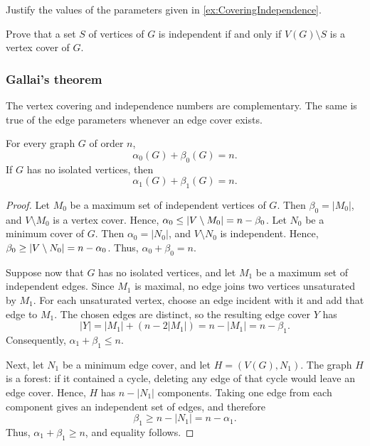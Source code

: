\begin{Exercise}
Justify the values of the parameters given in \cref{ex:CoveringIndependence}.
\end{Exercise}

\begin{Exercise}
Prove that a set $S$ of vertices of $G$ is independent if and only if $V(G) \setminus S$ is a vertex cover of $G$.
\end{Exercise}

\subsubsection{Gallai's theorem}
The vertex covering and independence numbers are complementary. The same is true of the edge parameters whenever an edge cover exists.

\begin{Theorem}[Gallai]
For every graph $G$ of order $n$,
\begin{equation*}
\alpha_0(G) + \beta_0(G) = n.
\end{equation*}
If $G$ has no isolated vertices, then
\begin{equation*}
\alpha_1(G) + \beta_1(G) = n.
\end{equation*}
\end{Theorem}

\begin{proof}
Let $M_0$ be a maximum set of independent vertices of $G$. Then $\beta_0 = |M_0|$, and $V \setminus M_0$ is a vertex cover. Hence, $\alpha_0 \le \vqty{V \setminus M_0} = n - \beta_0$. Let $N_0$ be a minimum cover of $G$. Then $\alpha_0 = |N_0|$, and $V \setminus N_0$ is independent. Hence, $\beta_0 \ge \vqty{V \setminus N_0} = n - \alpha_0$. Thus, $\alpha_0 + \beta_0 = n$.

Suppose now that $G$ has no isolated vertices, and let $M_1$ be a maximum set of independent edges. Since $M_1$ is maximal, no edge joins two vertices unsaturated by $M_1$. For each unsaturated vertex, choose an edge incident with it and add that edge to $M_1$. The chosen edges are distinct, so the resulting edge cover $Y$ has
\begin{equation*}
|Y|=|M_1|+(n-2|M_1|)=n-|M_1|=n-\beta_1.
\end{equation*}
Consequently, $\alpha_1+\beta_1\le n$.

Next, let $N_1$ be a minimum edge cover, and let $H=(V(G),N_1)$. The graph $H$ is a forest: if it contained a cycle, deleting any edge of that cycle would leave an edge cover. Hence, $H$ has $n-|N_1|$ components. Taking one edge from each component gives an independent set of edges, and therefore
\begin{equation*}
\beta_1\ge n-|N_1|=n-\alpha_1.
\end{equation*}
Thus, $\alpha_1+\beta_1\ge n$, and equality follows.
\end{proof}



